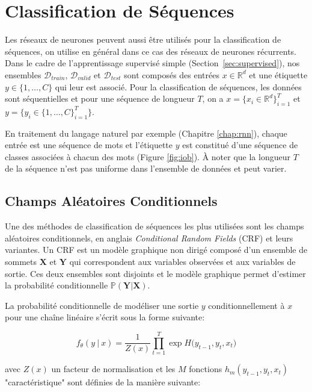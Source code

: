 \section{Classification de Séquences}

Les réseaux de neurones peuvent aussi être utilisés pour la classification de
séquences, on utilise en général dans ce cas des réseaux de neurones récurrents.
Dans le cadre de l'apprentissage supervisé simple
(Section~\ref{sec:supervised}), nos ensembles $\mathcal{D}_{train}$,
$\mathcal{D}_{valid}$ et  $\mathcal{D}_{test}$  sont composés des entrées
$x\in\mathbb{R}^{d}$ et une étiquette $y\in\{1,\dots ,C\}$ qui leur est associé.
Pour la classification de séquences, les données sont séquentielles et pour une
séquence de longueur $T$, on a $x=\lbrace x_{i}\in\mathbb{R}^{d}
\rbrace_{i=1}^{T}$ et $y=\lbrace y_{i}\in\{1,\dots ,C\}_{i=1}^{T}\}$.

En traitement du langage naturel par exemple (Chapitre \ref{chap:rnn}), chaque
entrée est une séquence de mots et l'étiquette $y$ est constitué d'une séquence de
classes associées à chacun des mots (Figure \ref{fig:iob}). À noter que la
longueur $T$ de la séquence n'est pas uniforme dans l'ensemble de données et
peut varier.

\subsection{Champs Aléatoires Conditionnels}

Une des méthodes de classification de séquences les plus utilisées sont les
champs aléatoires conditionnels, en anglais \textit{Conditional Random Fields}
(CRF) \citep{rnn6} et leurs variantes. Un CRF est un modèle graphique non
dirigé composé d'un ensemble de sommets $\boldsymbol{X}$ et $\boldsymbol{Y}$ qui
correspondent aux variables observées et aux variables de sortie. Ces deux
ensembles sont disjoints et le modèle graphique permet d'estimer la probabilité
conditionnelle $\mathbb{P}(\boldsymbol{Y}|\boldsymbol{X})$.

La probabilité conditionnelle de
modéliser une sortie $y$ conditionnellement à $x$ pour une chaîne linéaire
s'écrit sous la forme suivante:

\begin{equation}
f_{\theta}(y~\vert~x) = \frac{1}{Z(x)}\prod_{t=1}^{T}\exp{H(y_{t-1}, y_{t}, x_{t}})
\end{equation}

avec $Z(x)$ un facteur de normalisation et les $M$ fonctions $h_{m}(y_{t-1},
y_{t}, x_{t})$ "caractéristique" sont définies de la manière suivante:

